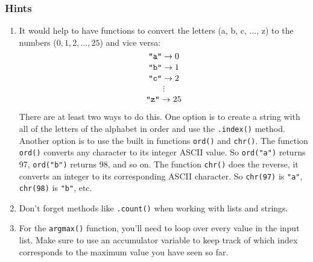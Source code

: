 \documentclass[12pt]{article}
\begin{document}
\subsubsection*{Hints}

\begin{enumerate}
\item It would help to have functions to convert the letters (a, b, c, $\ldots$, z) to the numbers ($0, 1, 2, \ldots, 25$) and vice versa: 
$$\verb|"a"| \rightarrow 0$$ 
$$\verb|"b"| \rightarrow 1$$ 
$$\verb|"c"| \rightarrow 2$$
$$\vdots$$
$$\verb|"z"| \rightarrow 25$$

There are at least two ways to do this.  One option is to create a string with all of the letters of the alphabet in order and use the \verb|.index()| method.  Another option is to use the built in functions \verb|ord()| and \verb|chr()|.  The function \verb|ord()| converts any character to its integer ASCII value.  So \verb|ord("a")| returns 97, \verb|ord("b")| returns 98, and so on. The function \verb|chr()| does the reverse, it converts an integer to its corresponding ASCII character.  So \verb|chr(97)| is \verb|"a"|, \verb|chr(98)| is \verb|"b"|, etc. 

\item Don't forget methods like \verb|.count()| when working with lists and strings.  

\item For the \verb|argmax()| function, you'll need to loop over every value in the input list.  Make sure to use an accumulator variable to keep track of which index corresponds to the maximum value you have seen so far. 
\end{enumerate}
\end{document}
